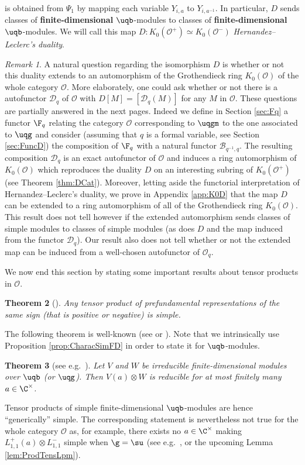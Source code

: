 \documentclass[11pt]{amsart}
\newtheorem{theorem}{Theorem}[section]
\theoremstyle{definition}
\theoremstyle{remark}
\newtheorem{rem}[theorem]{Remark}
\numberwithin{equation}{section}
\begin{document}
is obtained from $\Psi_1$ by mapping each variable $Y_{i,a}$ to $Y_{i,a^{-1}}$. In particular, $D$ sends classes of \textbf{finite-dimensional} $\uqb$-modules to classes of \textbf{finite-dimensional} $\uqb$-modules. We will call this map $D:K_0(\mathcal{O}^+)\simeq K_0(\mathcal{O}^-)$ \textit{Hernandez--Leclerc's duality}.
\begin{rem} 
 A natural question regarding the isomorphism $D$ is whether or not this duality extends to an automorphism of the Grothendieck ring $K_0(\mathcal{O})$ of the whole category $\mathcal{O}$. More elaborately, one could ask whether or not there is a autofunctor $\mathcal{D}_q$ of $\mathcal{O}$ with $D[M] = [\mathcal{D}_q(M)]$ for any $M$ in $\mathcal{O}$. These questions are partially answered in the next pages. Indeed we define in Section \ref{sec:Fq} a functor $\F_q$ relating the category $\mathcal{O}$ corresponding to $\uqgm$ to the one associated to $\uqg$ and consider (assuming that $q$ is a formal variable, see Section \ref{sec:FuncD}) the composition of $\F_q$ with a natural functor $\mathcal{B}_{q^{-1},q}$. The resulting composition $\mathcal{D}_q$ is an exact autofunctor of $\mathcal{O}$ and induces a ring automorphism of $K_0(\mathcal{O})$ which reproduces the duality $D$ on an interesting subring of $K_0(\mathcal{O}^{+})$ (see Theorem \ref{thm:DCat}). Moreover, letting aside the functorial interpretation of Hernandez--Leclerc's duality, we prove in Appendix \ref{app:K0D} that the map $D$ can be extended to a ring automorphism of all of the Grothendieck ring $K_0(\mathcal{O})$. This result does not tell however if the extended automorphism sends classes of simple modules to classes of simple modules (as does $D$ and the map induced from the functor $\mathcal{D}_q$). Our result also does not tell whether or not the extended map can be induced from a well-chosen autofunctor of $\mathcal{O}_q$.
\end{rem}
We now end this section by stating some important results about tensor products in $\mathcal{O}$. 
\begin{theorem}[{\cite[Theorem 4.11]{fh1}}]\label{thm:ProdPrefond}
Any tensor product of prefundamental representations of the same sign (that is positive or negative) is simple. 
\end{theorem}
The following theorem is well-known (see \cite[Theorem 3]{ch} or \cite[Propositions 9.2.4 and 9.5.3]{efk}). Note that we intrinsically use Proposition \ref{prop:CharacSimFD} in order to state it for $\uqb$-modules.
\begin{theorem}[see e.g.~\cite{ch,efk}]
\label{thm:genSim} Let $V$ and $W$ be irreducible finite-dimensional modules over $\uqb$ (or $\uqg$). Then $V(a)\otimes W$ is reducible for at most finitely many $a \in \C^{\times}$. 
\end{theorem}
Tensor products of simple finite-dimensional $\uqb$-modules are hence ``generically'' simple. The corresponding statement is nevertheless not true for the whole category $\mathcal{O}$ as, for example, there exists no $a\in\C^{\times}$ making $L_{1,1}^+(a)\otimes L_{1,1}^-$ simple when $\g = \su$ (see e.g.~\cite[Example 5.1]{her}, \cite{bjmst} or the upcoming Lemma \ref{lem:ProdTensLpm}).
\end{document}
